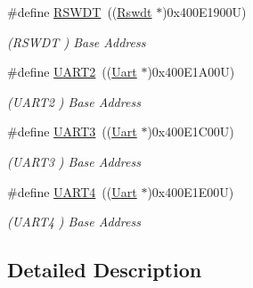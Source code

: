 \begin{DoxyCompactItemize}
\mbox{\label{group__SAME70J21__base_ga4efdb974edf009cb6dbb3e9fadcf28a0}} 
\#define \mbox{\hyperlink{group__SAME70J21__base_ga4efdb974edf009cb6dbb3e9fadcf28a0}{R\+S\+W\+DT}}~((\mbox{\hyperlink{structRswdt}{Rswdt}}  $\ast$)0x400\+E1900\+U)
\begin{DoxyCompactList}\small\item\em (R\+S\+W\+DT ) Base Address \end{DoxyCompactList}\item 
\mbox{\label{group__SAME70J21__base_ga7f6bd6eb89ae2eeae97af4207ebe3cde}} 
\#define \mbox{\hyperlink{group__SAME70J21__base_ga7f6bd6eb89ae2eeae97af4207ebe3cde}{U\+A\+R\+T2}}~((\mbox{\hyperlink{structUart}{Uart}}   $\ast$)0x400\+E1\+A00\+U)
\begin{DoxyCompactList}\small\item\em (U\+A\+R\+T2 ) Base Address \end{DoxyCompactList}\item 
\mbox{\label{group__SAME70J21__base_ga961726a611b38bcaf61f3d598b0a59ec}} 
\#define \mbox{\hyperlink{group__SAME70J21__base_ga961726a611b38bcaf61f3d598b0a59ec}{U\+A\+R\+T3}}~((\mbox{\hyperlink{structUart}{Uart}}   $\ast$)0x400\+E1\+C00\+U)
\begin{DoxyCompactList}\small\item\em (U\+A\+R\+T3 ) Base Address \end{DoxyCompactList}\item 
\mbox{\label{group__SAME70J21__base_ga7c035f6f443c999fc043b2b7fb598800}} 
\#define \mbox{\hyperlink{group__SAME70J21__base_ga7c035f6f443c999fc043b2b7fb598800}{U\+A\+R\+T4}}~((\mbox{\hyperlink{structUart}{Uart}}   $\ast$)0x400\+E1\+E00\+U)
\begin{DoxyCompactList}\small\item\em (U\+A\+R\+T4 ) Base Address \end{DoxyCompactList}\end{DoxyCompactItemize}


\subsection{Detailed Description}

